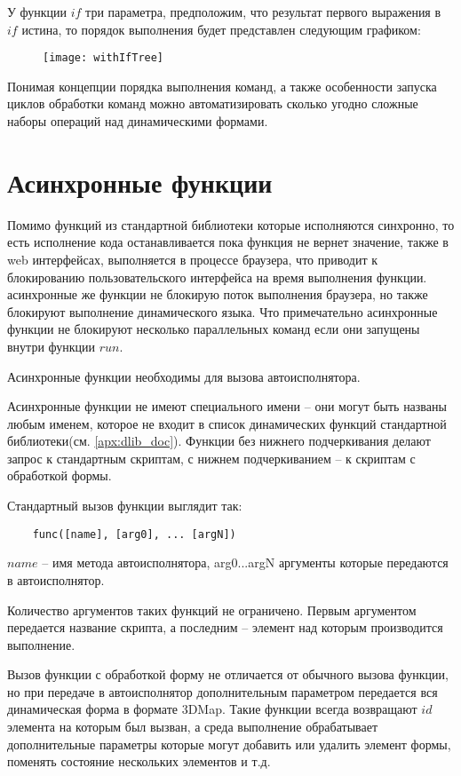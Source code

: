\documentclass[../index.tex]{subfiles}
\begin{document}
У функции $if$ три параметра, предположим, что результат первого выражения в $if$ истина, то порядок выполнения будет представлен следующим графиком:
\begin{figure}[h]
	\texttt{[image: withIfTree]}
	\centering
\end{figure}

Понимая концепции порядка выполнения команд, а также особенности запуска циклов обработки команд можно автоматизировать сколько угодно сложные наборы операций над динамическими формами.

\label{sec:async}
\section{Асинхронные функции}

Помимо функций из стандартной библиотеки которые исполняются синхронно, 
то есть исполнение кода останавливается пока функция не вернет значение, также 
в web интерфейсах, выполняется в процессе браузера, что приводит к блокированию 
пользовательского интерфейса на время выполнения функции.
асинхронные же функции не блокирую поток выполнения браузера, но также блокируют 
выполнение динамического языка. Что примечательно асинхронные функции не блокируют
несколько параллельных команд если они запущены внутри функции $run$.

Асинхронные функции необходимы для вызова автоисполнятора.

Асинхронные функции не имеют специального имени -- они могут быть названы любым именем, которое не входит в список динамических функций стандартной библиотеки(см. \autoref{apx:dlib_doc}).
Функции без нижнего подчеркивания делают запрос к стандартным скриптам, с нижнем подчеркиванием -- 
к скриптам с обработкой формы.

Стандартный вызов функции выглядит так:
\begin{verbatim}
    func([name], [arg0], ... [argN])
\end{verbatim}

$name$ -- имя метода автоисполнятора, arg0...argN аргументы которые передаются в автоисполнятор.

Количество аргументов таких функций не ограничено. Первым аргументом передается название скрипта, 
а последним -- элемент над которым производится выполнение.

Вызов функции с обработкой форму не отличается от обычного вызова функции, но при передаче в автоисполнятор
дополнительным параметром передается вся динамическая форма в формате 3DMap. 
Такие функции всегда возвращают $id$ элемента на которым был вызван, а среда выполнение обрабатывает 
дополнительные параметры которые могут добавить или удалить элемент формы, поменять состояние нескольких элементов
и т.д.  
\end{document}
